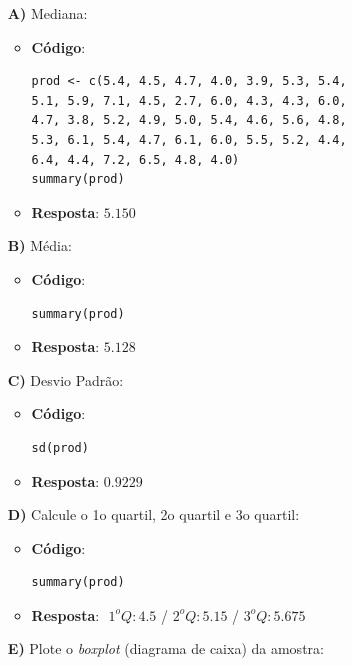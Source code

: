 \documentclass[a4paper,12pt]{article}
\begin{document}
\begin{enumerate}
    \begin{itemize}
        \item[\textbf{A)}] Mediana:
            \begin{itemize}
                \item \textbf{Código}:
                \begin{lstlisting}
prod <- c(5.4, 4.5, 4.7, 4.0, 3.9, 5.3, 5.4, 
5.1, 5.9, 7.1, 4.5, 2.7, 6.0, 4.3, 4.3, 6.0, 
4.7, 3.8, 5.2, 4.9, 5.0, 5.4, 4.6, 5.6, 4.8, 
5.3, 6.1, 5.4, 4.7, 6.1, 6.0, 5.5, 5.2, 4.4, 
6.4, 4.4, 7.2, 6.5, 4.8, 4.0)
summary(prod)
                \end{lstlisting}
                \item \textbf{Resposta}:  \textbf{$5.150$}
            \end{itemize}  
        \item[\textbf{B)}] Média:
            \begin{itemize}
                \item \textbf{Código}:
                \begin{lstlisting}
summary(prod)
                \end{lstlisting}
                \item \textbf{Resposta}:  \textbf{$5.128$}
            \end{itemize}
        \item[\textbf{C)}] Desvio Padrão:
            \begin{itemize}
                \item \textbf{Código}:
                \begin{lstlisting}
sd(prod)
                \end{lstlisting}
                \item \textbf{Resposta}:  \textbf{$0.9229$}
            \end{itemize}
        \item[\textbf{D)}] Calcule o 1o quartil, 2o quartil e 3o quartil:
            \begin{itemize}
                \item \textbf{Código}:
                \begin{lstlisting}
summary(prod)
                \end{lstlisting}
                \item \textbf{Resposta}: $ $ $1^{o}Q: 4.5$ / $2^{o}Q: 5.15$ / $3^{o}Q: 5.675$ 
            \end{itemize}
        \item[\textbf{E)}] Plote o \textit{boxplot} (diagrama de caixa) da amostra:

\end{itemize}
\end{enumerate}
\end{document}
